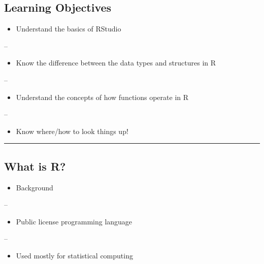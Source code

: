 \documentclass[]{article}
\providecommand{\tightlist}{%
  \setlength{\itemsep}{0pt}\setlength{\parskip}{0pt}}
\begin{document}
\hypertarget{learning-objectives}{%
\subsection{Learning Objectives}\label{learning-objectives}}

\begin{itemize}
\tightlist
\item
  Understand the basics of RStudio
\end{itemize}

--

\begin{itemize}
\tightlist
\item
  Know the difference between the data types and structures in R
\end{itemize}

--

\begin{itemize}
\tightlist
\item
  Understand the concepts of how functions operate in R
\end{itemize}

--

\begin{itemize}
\tightlist
\item
  Know where/how to look things up!
\end{itemize}

\begin{center}\rule{0.5\linewidth}{\linethickness}\end{center}

\hypertarget{what-is-r}{%
\subsection{What is R?}\label{what-is-r}}

\begin{itemize}
\tightlist
\item
  Background
\end{itemize}

--

\begin{itemize}
\tightlist
\item
  Public license programming language
\end{itemize}

--

\begin{itemize}
\tightlist
\item
  Used mostly for statistical computing
\end{itemize}
\end{document}
